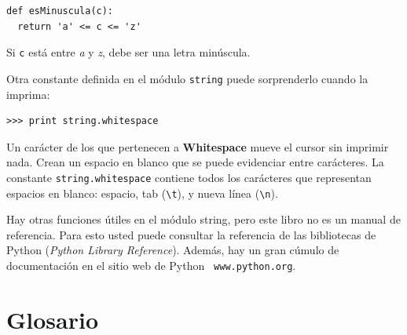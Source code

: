 \beforeverb
\begin{verbatim}
def esMinuscula(c):
  return 'a' <= c <= 'z'
\end{verbatim}
\afterverb
%
Si \texttt{c} está entre {\em a} y  {\em z}, debe ser una letra minúscula.

Otra constante definida en el módulo \texttt{string} puede sorprenderlo
cuando la imprima:

\beforeverb
\begin{verbatim}
>>> print string.whitespace
\end{verbatim}
\afterverb
%
Un carácter de los que pertenecen a {\bf Whitespace} mueve el cursor 
sin imprimir nada. Crean un espacio en blanco que se puede evidenciar entre
carácteres. La constante \texttt{string.whitespace} contiene todos
los carácteres que representan espacios en blanco: espacio, tab (\verb+\t+), 
y nueva línea (\verb+\n+).


Hay otras funciones útiles en el módulo string, pero este libro no es 
un manual de referencia. Para esto usted puede consultar la referencia
de las bibliotecas de Python ({\em Python Library Reference}). Además, hay
un gran cúmulo de documentación en el sitio web de Python {\tt
www.python.org}.


\section{Glosario}

